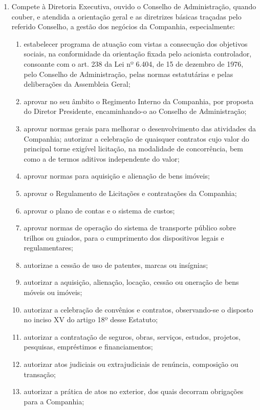 \documentclass[a4paper,11pt]{report}
\begin{document}
\begin{enumerate}[resume, label=Art. \arabic*]
\item Compete à Diretoria Executiva, ouvido o Conselho de Administração, quando couber, e atendida a orientação geral e as diretrizes básicas traçadas pelo referido Conselho, a gestão dos negócios da Companhia, especialmente:

        \begin{enumerate}[label=\roman*.]
        \item estabelecer programa de atuação com vistas a consecução dos objetivos sociais, na conformidade da orientação fixada pelo acionista controlador, consoante com o art. 238 da Lei nº 6.404, de 15 de dezembro de 1976, pelo Conselho de Administração, pelas normas estatutárias e pelas deliberações da Assembleia Geral;
        \item aprovar no seu âmbito o Regimento Interno da Companhia, por proposta do Diretor Presidente, encaminhando-o ao Conselho de Administração;
        \item aprovar normas gerais para melhorar o desenvolvimento das atividades da Companhia;
        autorizar a celebração de quaisquer contratos cujo valor do principal torne exigível licitação, na modalidade de concorrência, bem como a de termos aditivos independente do valor;
        \item aprovar normas para aquisição e alienação de bens imóveis;
        \item aprovar o Regulamento de Licitações e contratações da Companhia;
        \item aprovar o plano de contas e o sistema de custos;
        \item aprovar normas de operação do sistema de transporte público sobre trilhos ou guiados, para o cumprimento dos dispositivos legais e regulamentares;
        \item autorizae a cessão de uso de patentes, marcas ou insígnias;
        \item autorizar a aquisição, alienação, locação, cessão ou oneração de bens móveis ou imóveis;
        \item autorizar a celebração de convênios e contratos, observando-se o disposto no inciso XV do artigo 18º desse Estatuto;
        \item autorizar a contratação de seguros, obras, serviços, estudos, projetos, pesquisas, empréstimos e financiamentos;
        \item autorizar atos judiciais ou extrajudiciais de renúncia, composição ou transação;
        \item autorizar a prática de atos no exterior, dos quais decorram obrigações para a Companhia;

\end{enumerate}
\end{enumerate}
\end{document}
